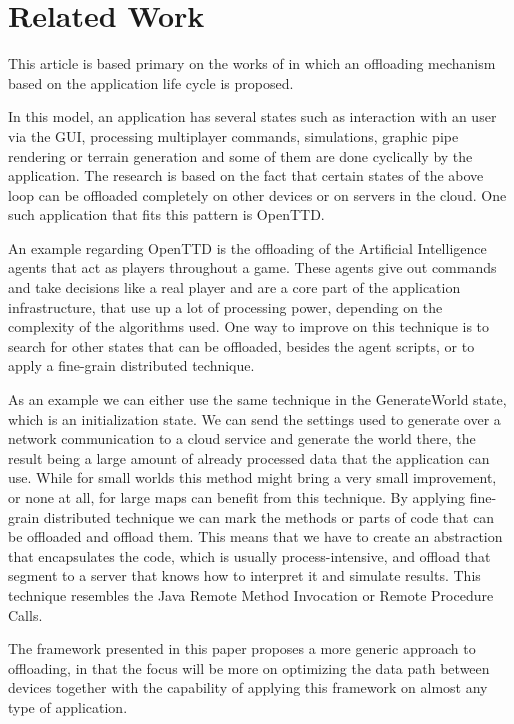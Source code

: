 \section{Related Work}
\label{relatedwork}

This article is based primary on the works of \cite{Alex} in which an offloading mechanism based on the application life cycle is proposed.

In this model, an application has several states such as interaction with an user via the GUI, processing multiplayer commands, simulations, graphic pipe rendering or terrain generation and some of them are done cyclically by the application. The research is based on the fact that certain states of the above loop can be offloaded completely on other devices or on servers in the cloud. One such application that fits this pattern is OpenTTD. 

An example regarding OpenTTD is the offloading of the Artificial Intelligence agents that act as players throughout a game. These agents give out commands and take decisions like a real player and are a core part of the application infrastructure, that use up a lot of processing power, depending on the complexity of the algorithms used. One way to improve on this technique is to search for other states that can be offloaded, besides the agent scripts, or to apply a fine-grain distributed technique. 

As an example we can either use the same technique in the GenerateWorld state, which is an initialization state. We can send the settings used to generate over a network communication to a cloud service and generate the world there, the result being a large amount of already processed data that the application can use. While for small worlds this method might bring a very small improvement, or none at all, for large maps can benefit from this technique. By applying fine-grain distributed technique we can mark the methods or parts of code that can be offloaded and offload them. This means that we have to create an abstraction that encapsulates the code, which is usually process-intensive, and offload that segment to a server that knows how to interpret it and simulate results. This technique resembles the Java Remote Method Invocation or Remote Procedure Calls.

The framework presented in this paper proposes a more generic approach to offloading, in that the focus will be more on optimizing the data path between devices together with the capability of applying this framework on almost any type of application.

